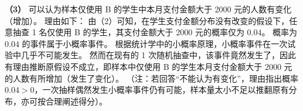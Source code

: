 \begin{answer}
\textbf{（3）}
可以认为样本仅使用 B 的学生中本月支付金额大于 2000 元的人数有变化（增加）。
理由如下：
由（2）可知，在学生支付金额分布没有改变的假设下，任意抽查 1 名仅使用 B 的学生，其支付金额大于 2000 元的概率仅为 $0.04$。
概率为 $0.04$ 的事件属于小概率事件。
根据统计学中的小概率原理，小概率事件在一次试验中几乎不可能发生。
然而在现有的 1 次随机抽查中，该事件竟然发生了，因此有理由推断原假设不成立，即样本中仅使用 B 的学生本月支付金额大于 2000 元的人数有所增加（发生了变化）。
（注：若回答“不能认为有变化”，理由指出概率 $0.04 > 0$，一次抽样偶然发生小概率事件仍有可能，样本量太小不足以推翻原有分布，亦可按合理阐述得分）。




\end{answer}

